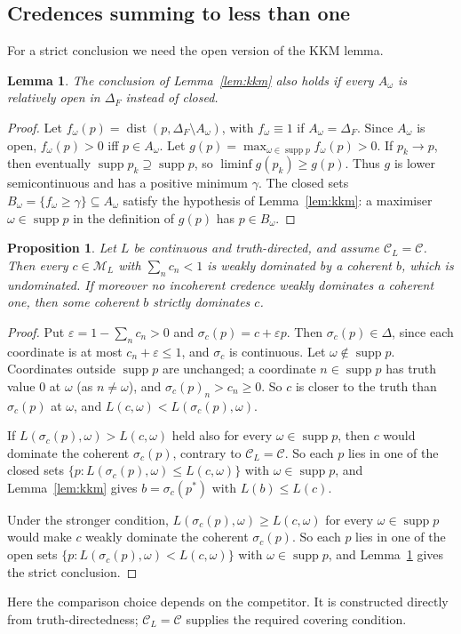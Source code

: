 \documentclass[11pt]{article}
\newtheorem{lemma}[theorem]{Lemma}
\newtheorem{proposition}[theorem]{Proposition}
\theoremstyle{definition}
\theoremstyle{remark}
\newcommand{\M}{\mathcal M}
\newcommand{\C}{\mathcal C}
\newcommand{\supp}{\operatorname{supp}}
\begin{document}
\subsection{Credences summing to less than one}
For a strict conclusion we need the open version of the KKM lemma.
\begin{lemma}\label{lem:openkkm}
The conclusion of Lemma~\ref{lem:kkm} also holds if every $A_\omega$ is relatively open in $\Delta_F$ instead of closed.
\end{lemma}
\begin{proof}
Let $f_\omega(p)=\operatorname{dist}(p,\Delta_F\setminus A_\omega)$, with $f_\omega\equiv1$ if $A_\omega=\Delta_F$. Since $A_\omega$ is open, $f_\omega(p)>0$ iff $p\in A_\omega$. Let $g(p)=\max_{\omega\in\supp p}f_\omega(p)>0$. If $p_k\to p$, then eventually $\supp p_k\supseteq\supp p$, so $\liminf g(p_k)\ge g(p)$. Thus $g$ is lower semicontinuous and has a positive minimum $\gamma$. The closed sets $B_\omega=\{f_\omega\ge\gamma\}\subseteq A_\omega$ satisfy the hypothesis of Lemma~\ref{lem:kkm}: a maximiser $\omega\in\supp p$ in the definition of $g(p)$ has $p\in B_\omega$.
\end{proof}

\begin{proposition}\label{prop:joyce-sub}
Let $L$ be continuous and truth-directed, and assume $\C_L=\C$. Then every $c\in\M_L$ with $\sum_nc_n<1$ is weakly dominated by a coherent $b$, which is undominated. If moreover no incoherent credence weakly dominates a coherent one, then some coherent $b$ strictly dominates $c$.
\end{proposition}
\begin{proof}
Put $\varepsilon=1-\sum_nc_n>0$ and $\sigma_c(p)=c+\varepsilon p$. Then $\sigma_c(p)\in\Delta$, since each coordinate is at most $c_n+\varepsilon\le1$, and $\sigma_c$ is continuous. Let $\omega\notin\supp p$. Coordinates outside $\supp p$ are unchanged; a coordinate $n\in\supp p$ has truth value $0$ at $\omega$ (as $n\ne\omega$), and $\sigma_c(p)_n>c_n\ge0$. So $c$ is closer to the truth than $\sigma_c(p)$ at $\omega$, and $L(c,\omega)<L(\sigma_c(p),\omega)$.

If $L(\sigma_c(p),\omega)>L(c,\omega)$ held also for every $\omega\in\supp p$, then $c$ would dominate the coherent $\sigma_c(p)$, contrary to $\C_L=\C$. So each $p$ lies in one of the closed sets $\{p:L(\sigma_c(p),\omega)\le L(c,\omega)\}$ with $\omega\in\supp p$, and Lemma~\ref{lem:kkm} gives $b=\sigma_c(p^*)$ with $L(b)\le L(c)$.

Under the stronger condition, $L(\sigma_c(p),\omega)\ge L(c,\omega)$ for every $\omega\in\supp p$ would make $c$ weakly dominate the coherent $\sigma_c(p)$. So each $p$ lies in one of the open sets $\{p:L(\sigma_c(p),\omega)<L(c,\omega)\}$ with $\omega\in\supp p$, and Lemma~\ref{lem:openkkm} gives the strict conclusion.
\end{proof}
Here the comparison choice depends on the competitor. It is constructed directly from truth-directedness; $\C_L=\C$ supplies the required covering condition.
\end{document}
